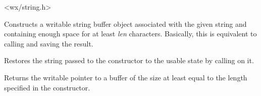 <wx/string.h>




Constructs a writable string buffer object associated with the given string
and containing enough space for at least {\it len} characters. Basically, this
is equivalent to calling  and
saving the result.



Restores the string passed to the constructor to the usable state by calling 
 on it.



Returns the writable pointer to a buffer of the size at least equal to the
length specified in the constructor.


